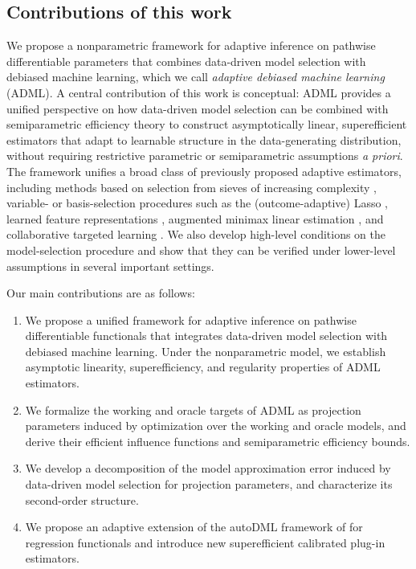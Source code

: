 \documentclass[11pt]{article}
\theoremstyle{definition}
\begin{document}
 
\subsection{Contributions of this work}

We propose a nonparametric framework for adaptive inference on pathwise differentiable parameters that combines data-driven model selection with debiased machine learning, which we call \textit{adaptive debiased machine learning} (ADML). A central contribution of this work is conceptual: ADML provides a unified perspective on how data-driven model selection can be combined with semiparametric efficiency theory to construct asymptotically linear, superefficient estimators that adapt to learnable structure in the data-generating distribution, without requiring restrictive parametric or semiparametric assumptions \textit{a priori}. The framework unifies a broad class of previously proposed adaptive estimators, including methods based on selection from sieves of increasing complexity \citep{CTMLE, ju2019scalable}, variable- or basis-selection procedures such as the (outcome-adaptive) Lasso \citep{moosavi2023costs, outcomeadaptivelasso, HALoutcomeAdapt, apfel2024learning}, learned feature representations \citep{ATEsupereff, d2021deconfounding,clivio2026deconfounding, assaad2021counterfactual, wang2023super}, augmented minimax linear estimation \citep{augmentedMinimax}, and collaborative targeted learning \citep{CTMLE, ATEsupereff}. We also develop high-level conditions on the model-selection procedure and show that they can be verified under lower-level assumptions in several important settings.


Our main contributions are as follows:
\begin{enumerate}
    \item We propose a unified framework for adaptive inference on pathwise differentiable functionals that integrates data-driven model selection with debiased machine learning. Under the nonparametric model, we establish asymptotic linearity, superefficiency, and regularity properties of ADML estimators.

    \item We formalize the working and oracle targets of ADML as projection parameters induced by optimization over the working and oracle models, and derive their efficient influence functions and semiparametric efficiency bounds.

\item We develop a decomposition of the model approximation error induced by data-driven model selection for projection parameters, and characterize its second-order structure.

 \item We propose an adaptive extension of the autoDML framework of \cite{chernozhukov2022automatic} for regression functionals and introduce new superefficient calibrated plug-in estimators.
\end{enumerate}
\end{document}
